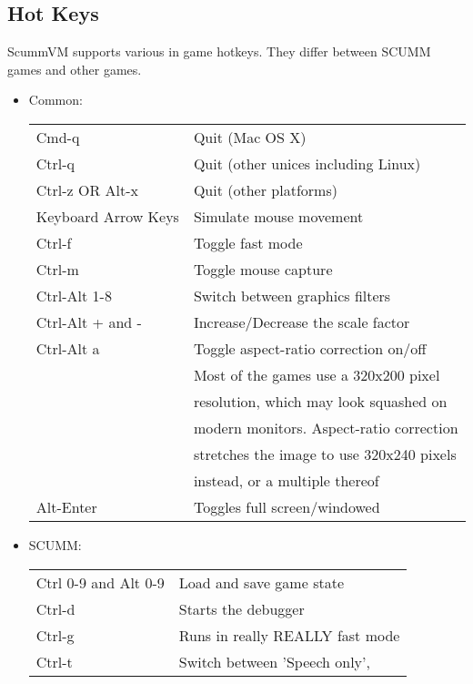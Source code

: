 \subsection{Hot Keys}

ScummVM supports various in game hotkeys. They differ between SCUMM games and
other games.

\begin{itemize}
\item Common:\\
  \begin{tabular}{ll}
    Cmd-q                  & Quit (Mac OS X)\\
    Ctrl-q                 & Quit (other unices including Linux)\\
    Ctrl-z OR Alt-x        & Quit (other platforms)\\
    Keyboard Arrow Keys    & Simulate mouse movement\\
    Ctrl-f                 & Toggle fast mode\\
    Ctrl-m                 & Toggle mouse capture\\
    Ctrl-Alt 1-8           & Switch between graphics filters\\
    Ctrl-Alt + and -       & Increase/Decrease the scale factor\\
    Ctrl-Alt a             & Toggle aspect-ratio correction on/off\\
                           & Most of the games use a 320x200 pixel\\
                           & resolution, which may look squashed on\\
                           & modern monitors. Aspect-ratio correction\\
                           & stretches the image to use 320x240 pixels\\
                           & instead, or a multiple thereof\\
    Alt-Enter              & Toggles full screen/windowed\\
  \end{tabular}
\item SCUMM:\\
  \begin{tabular}{ll}
    Ctrl 0-9 and Alt 0-9   & Load and save game state\\
    Ctrl-d                 & Starts the debugger\\
    Ctrl-g                 & Runs in really REALLY fast mode\\
    Ctrl-t                 & Switch between 'Speech only',\\

\end{tabular}
\end{itemize}
